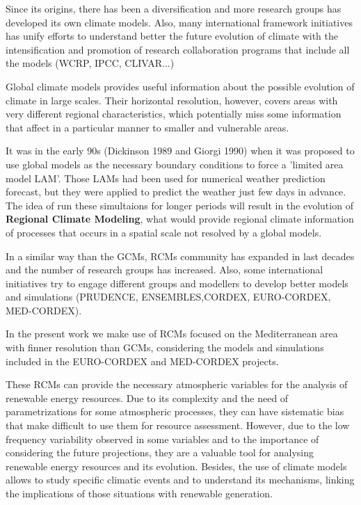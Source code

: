 Since its origins, there has been a diversification and more research groups has developed its own climate models. Also, many international framework initiatives has unify efforts to understand better the future evolution of climate with the intensification and promotion of research collaboration programs that include all the models (WCRP, IPCC, CLIVAR...)   

Global climate models provides useful information about the possible evolution of climate in large scales. Their horizontal resolution, however, covers areas with very different regional characteristics, which potentially miss some information that affect in a particular manner to smaller and vulnerable areas.

It was in the early 90s (Dickinson 1989 and Giorgi 1990) when it was proposed to use global models as the necessary boundary conditions to force a 'limited area model LAM'. Those LAMs had been used for numerical weather prediction forecast, but they were applied to predict the weather just few days in advance. The idea of run these simultaions for longer periods will result in the evolution of \textbf{Regional Climate Modeling}, what would provide regional climate information of processes that occurs in a spatial scale not resolved by a global models.

In a similar way than the GCMs, RCMs community has expanded in last decades and the number of research groups has increased. Also, some international initiatives try to engage different groups and modellers to develop better models and simulations (PRUDENCE, ENSEMBLES,CORDEX, EURO-CORDEX, MED-CORDEX).

In the present work we make use of RCMs focused on the Mediterranean area with finner resolution than GCMs, considering the models and simulations included in the EURO-CORDEX and MED-CORDEX projects.

These RCMs can provide the necessary atmospheric variables for the analysis of renewable energy resources. Due to its complexity and the need of parametrizations for some atmospheric processes, they can have sistematic bias that make difficult to use them for resource assessment. However, due to the low frequency variability observed in some variables and to the importance of considering the future projections, they are a valuable tool for analysing renewable energy resources and its evolution. Besides, the use of climate models allows to study specific climatic events and to understand its mechanisms, linking the implications of those situations with renewable generation.

